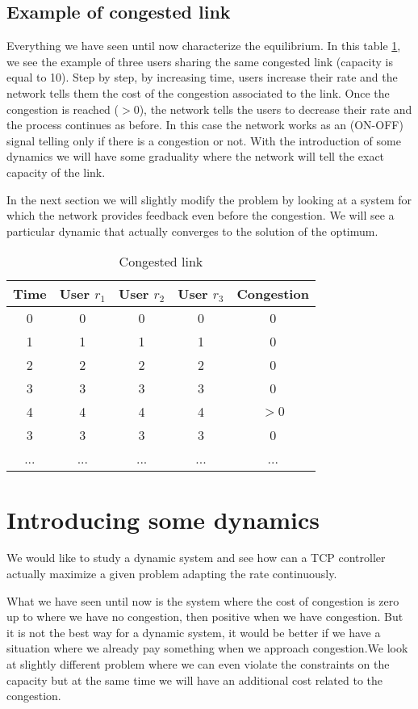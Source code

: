 \subsection{Example of congested link}
Everything we have seen until now characterize the equilibrium. In this table \ref{tab:table1}, we see the example of three users sharing the same congested link (capacity is equal to 10). Step by step, by increasing time, users increase their rate and the network tells them the cost of the congestion associated to the link. Once the congestion is reached ($>0$), the network tells the users to decrease their rate and the process continues as before. In this case the network works as an (ON-OFF) signal telling only if there is a congestion or not.
With the introduction of some dynamics we will have some graduality where the network will tell the exact capacity of the link.

In the next section we will slightly modify the problem by looking at a system for which the network provides feedback even before the congestion. We will see a particular dynamic that actually converges to the solution of the optimum.

\begin{table}[h!]
	\centering
	\caption{Congested link}
	\label{tab:table1}
	\begin{tabular}{ccccc}
		\toprule
		Time & User $r_1$  & User $r_2$ & User $r_3$ & Congestion\\
		\midrule
		0 & 0 & 0 & 0 &0\\
		1 & 1 & 1 & 1&0\\
		2 & 2 & 2 & 2 &0\\
		3 & 3 & 3 & 3 &0\\
		4 & 4 & 4 & 4 & \underline{$>0$}\\
		3 & 3 & 3 & 3 &0\\
		... & ... & ... & ... &...\\
		\bottomrule
	\end{tabular}
\end{table}

\section{Introducing some dynamics}

We would like to study a dynamic system and see how can a TCP controller actually maximize a given problem adapting the rate continuously.

What we have seen until now is the system where  the cost of congestion is zero up to where we have no congestion, then positive when we have congestion. But it is not the best way for a dynamic system, it would be  better if we have a situation where we already pay something when we approach congestion.We look at slightly different problem where we can even violate the constraints on the capacity but at the same time we will have an additional cost related to the congestion.

